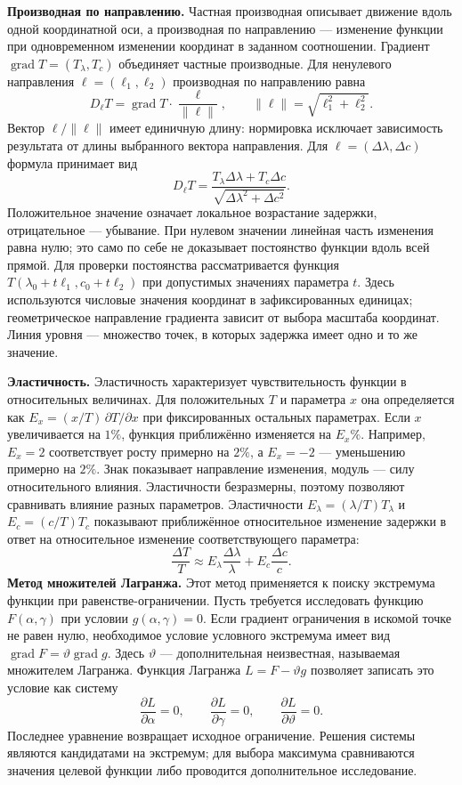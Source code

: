 \documentclass[12pt,a4paper]{article}
\begin{document}
\textbf{Производная по направлению.}
Частная производная описывает движение вдоль одной координатной оси,
а производная по направлению --- изменение функции при одновременном
изменении координат в заданном соотношении.
Градиент $\operatorname{grad}T=(T_\lambda,T_c)$ объединяет частные производные.
Для ненулевого направления $\ell=(\ell_1,\ell_2)$ производная по направлению равна
\[
D_\ell T=\operatorname{grad}T\cdot\frac{\ell}{\|\ell\|},
\qquad \|\ell\|=\sqrt{\ell_1^2+\ell_2^2}.
\]
Вектор $\ell/\|\ell\|$ имеет единичную длину: нормировка исключает
зависимость результата от длины выбранного вектора направления.
Для $\ell=(\Delta\lambda,\Delta c)$ формула принимает вид
\[
D_\ell T=\frac{T_\lambda\Delta\lambda+T_c\Delta c}
{\sqrt{\Delta\lambda^2+\Delta c^2}}.
\]
Положительное значение означает локальное возрастание задержки,
отрицательное --- убывание. При нулевом значении линейная часть изменения
равна нулю; это само по себе не доказывает постоянство функции вдоль всей прямой.
Для проверки постоянства рассматривается функция
$T(\lambda_0+t\ell_1,c_0+t\ell_2)$ при допустимых значениях параметра $t$.
Здесь используются числовые значения координат в зафиксированных единицах;
геометрическое направление градиента зависит от выбора масштаба координат.
Линия уровня --- множество точек, в которых задержка имеет одно и то же значение.

\textbf{Эластичность.}
Эластичность характеризует чувствительность функции в относительных величинах.
Для положительных $T$ и параметра $x$ она определяется как
$E_x=(x/T)\,\partial T/\partial x$ при фиксированных остальных параметрах.
Если $x$ увеличивается на $1\%$, функция приближённо изменяется на $E_x\%$.
Например, $E_x=2$ соответствует росту примерно на $2\%$,
а $E_x=-2$ --- уменьшению примерно на $2\%$.
Знак показывает направление изменения, модуль --- силу относительного влияния.
Эластичности безразмерны, поэтому позволяют сравнивать влияние разных параметров.
Эластичности $E_\lambda=(\lambda/T)T_\lambda$ и $E_c=(c/T)T_c$
показывают приближённое относительное изменение задержки в ответ на
относительное изменение соответствующего параметра:
\[
\frac{\Delta T}{T}\approx E_\lambda\frac{\Delta\lambda}{\lambda}
+E_c\frac{\Delta c}{c}.
\]
\textbf{Метод множителей Лагранжа.}
Этот метод применяется к поиску экстремума функции при равенстве-ограничении.
Пусть требуется исследовать функцию $F(\alpha,\gamma)$ при условии
$g(\alpha,\gamma)=0$. Если градиент ограничения в искомой точке не равен нулю,
необходимое условие условного экстремума имеет вид
$\operatorname{grad}F=\vartheta\operatorname{grad}g$.
Здесь $\vartheta$ --- дополнительная неизвестная, называемая множителем Лагранжа.
Функция Лагранжа $L=F-\vartheta g$ позволяет записать это условие как систему
\[
\frac{\partial L}{\partial\alpha}=0,\qquad
\frac{\partial L}{\partial\gamma}=0,\qquad
\frac{\partial L}{\partial\vartheta}=0.
\]
Последнее уравнение возвращает исходное ограничение. Решения системы
являются кандидатами на экстремум; для выбора максимума сравниваются
значения целевой функции либо проводится дополнительное исследование.
\end{document}
